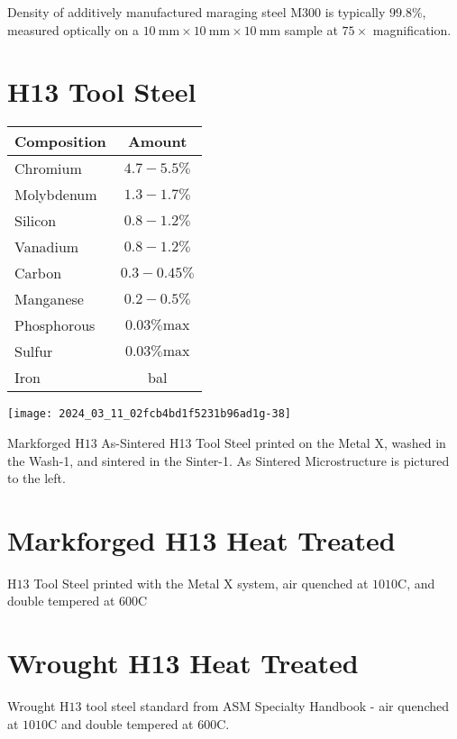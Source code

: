 \documentclass[10pt]{article}
\begin{document}
Density of additively manufactured maraging steel M300 is typically $99.8 \%$, measured optically on a $10 \mathrm{~mm} \times 10 \mathrm{~mm} \times 10 \mathrm{~mm}$ sample at $75 \times$ magnification.

\section*{H13 Tool Steel}
\begin{center}
\begin{tabular}{lc}
Composition & Amount \\
\hline
Chromium & $4.7-5.5 \%$ \\
\hline
Molybdenum & $1.3-1.7 \%$ \\
\hline
Silicon & $0.8-1.2 \%$ \\
\hline
Vanadium & $0.8-1.2 \%$ \\
\hline
Carbon & $0.3-0.45 \%$ \\
\hline
Manganese & $0.2-0.5 \%$ \\
\hline
Phosphorous & $0.03 \% \mathrm{max}$ \\
\hline
Sulfur & $0.03 \% \mathrm{max}$ \\
\hline
Iron & bal \\
\hline
\end{tabular}
\end{center}

\begin{center}
\texttt{[image: 2024\_03\_11\_02fcb4bd1f5231b96ad1g-38]}
\end{center}

Markforged $\mathrm{H} 13$ As-Sintered H13 Tool Steel printed on the Metal X, washed in the Wash-1, and sintered in the Sinter-1. As Sintered Microstructure is pictured to the left.

\section*{Markforged H13 Heat Treated}
$\mathrm{H} 13$ Tool Steel printed with the Metal X system, air quenched at $1010 \mathrm{C}$, and double tempered at $600 \mathrm{C}$

\section*{Wrought H13 Heat Treated}
Wrought $\mathrm{H} 13$ tool steel standard from ASM Specialty Handbook - air quenched at $1010 \mathrm{C}$ and double tempered at $600 \mathrm{C}$.
\end{document}
